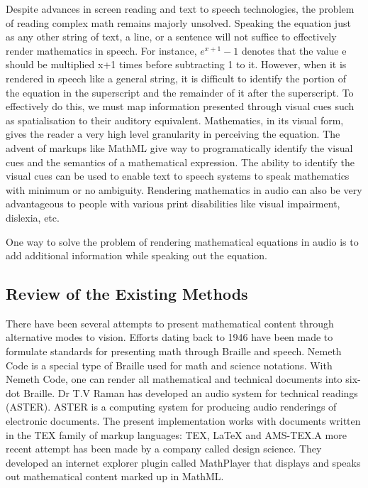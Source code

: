 \documentclass{article}
\begin{document}
Despite advances in screen reading and text to speech technologies, the problem of reading complex math remains majorly unsolved. Speaking the equation just as any other string of text, a line, or a sentence will not suffice to effectively render mathematics in speech. For instance, $e^{x+1}-1$ denotes that the value e should be multiplied x+1 times before subtracting 1 to it. However, when it is rendered in speech like a general string, it is difficult to identify the portion of the equation in the superscript and the remainder of it after the superscript.
To effectively do this, we must map information presented through visual cues such as spatialisation to their auditory equivalent. Mathematics, in its visual form, gives the reader a very high level granularity in perceiving the equation. The advent of markups like MathML give way to programatically identify the visual cues and the semantics of a mathematical expression. The ability to identify the visual cues can be used to enable text to speech systems to speak mathematics with minimum or no ambiguity. Rendering mathematics in audio can also be very advantageous to people with various print disabilities like visual impairment, dislexia, etc.


One way to solve the problem of rendering mathematical equations in audio is to add additional information while speaking out the equation. 

 



 







\subsection{Review of the Existing Methods}
\label{ssec:previous}

There have been several attempts to present mathematical content through alternative modes to vision. Efforts dating back to 1946 have been made to formulate standards for presenting math through Braille and speech. Nemeth Code\cite{nemeth1973nemeth} is a special type of Braille used for math and science notations. With Nemeth Code, one can render all mathematical and technical documents into six-dot Braille.
Dr T.V Raman has developed an audio system for technical readings (ASTER)\cite{raman1998audio}. ASTER is a computing system for producing audio renderings of electronic documents. The present implementation works with documents written in the TEX family of markup languages: TEX, LaTeX and AMS-TEX.A more recent attempt has been made by a company called design science. They developed an internet explorer plugin called MathPlayer that displays and speaks out mathematical content marked up in MathML\cite{soiffer2005mathplayer}.
\end{document}
